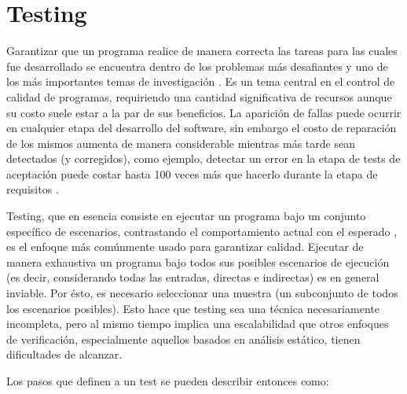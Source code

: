 \chapter[Testing]{Testing}
\label{cap:preliminares.testing}

Garantizar que un programa realice de manera correcta las tareas para las cuales fue desarrollado se encuentra dentro de los problemas m\'as desafiantes y uno de los m\'as importantes temas de investigaci\'on \cite{bibliography.books.GhezziBook,bibliography.books.PressmanBook,bibliography.books.JaloteBook}. Es un tema central en el control de calidad de programas, requiriendo una cantidad significativa de recursos \cite{bibliography.books.JaloteBook} aunque su costo suele estar a la par de sus beneficios. La aparici\'on de fallas puede ocurrir en cualquier etapa del desarrollo del software, sin embargo el costo de reparaci\'on de los mismos aumenta de manera considerable mientras m\'as tarde sean detectados (y corregidos), como ejemplo, detectar un error en la etapa de tests de aceptaci\'on puede costar hasta 100 veces m\'as que hacerlo durante la etapa de requisitos \cite{bibliography.books.JaloteBook}.

Testing, que en esencia consiste en ejecutar un programa bajo un conjunto espec\'ifico de escenarios, contrastando el comportamiento actual con el esperado \cite{bibliography.books.AmmannOffutt}, es el enfoque m\'as com\'unmente usado para garantizar calidad. Ejecutar de manera exhaustiva un programa bajo todos sus posibles escenarios de ejecuci\'on (es decir, considerando todas las entradas, directas e indirectas) es en general inviable. Por \'esto, es necesario seleccionar una muestra (un subconjunto de todos los escenarios posibles). Esto hace que testing sea una t\'ecnica necesariamente incompleta, pero al mismo tiempo implica una escalabilidad que otros enfoques de verificaci\'on, especialmente aquellos basados en an\'alisis est\'atico, tienen dificultades de alcanzar.

Los pasos que definen a un test se pueden describir entonces como:

